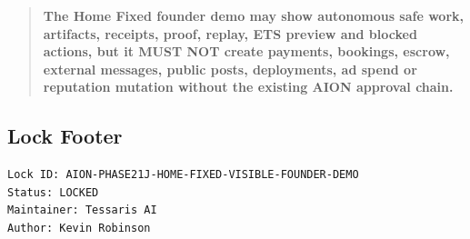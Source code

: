 \begin{quote}
\textbf{The Home Fixed founder demo may show autonomous safe work, artifacts, receipts, proof, replay, ETS preview and blocked actions, but it MUST NOT create payments, bookings, escrow, external messages, public posts, deployments, ad spend or reputation mutation without the existing AION approval chain.}
\end{quote}

\subsection{Lock Footer}

\begin{verbatim}
Lock ID: AION-PHASE21J-HOME-FIXED-VISIBLE-FOUNDER-DEMO
Status: LOCKED
Maintainer: Tessaris AI
Author: Kevin Robinson
\end{verbatim}
